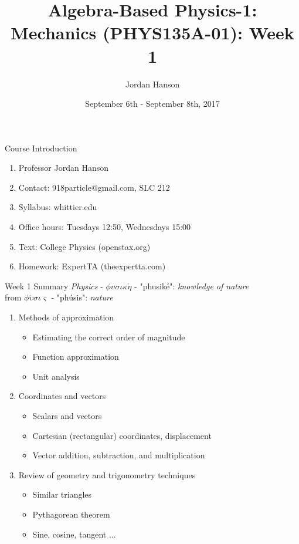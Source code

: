 \documentclass{beamer}
\title{Algebra-Based Physics-1: Mechanics (PHYS135A-01): Week 1}
\date{September 6th - September 8th, 2017}
\author{Jordan Hanson}
\institute{Whittier College Department of Physics and Astronomy}
\begin{document}
\maketitle

\begin{frame}{Course Introduction}
\begin{enumerate}
\item Professor Jordan Hanson
\item Contact: 918particle@gmail.com, SLC 212
\item Syllabus: whittier.edu
\item Office hours: Tuesdays 12:50, Wednesdays 15:00
\item Text: College Physics (openstax.org)
\item Homework: ExpertTA (theexpertta.com)
\end{enumerate}
\end{frame}

\begin{frame}{Week 1 Summary}
\textit{Physics} - $\phi\upsilon\sigma\iota\kappa\acute{\eta}$ - "phusik\'e": \textit{knowledge of nature} \\
from $\phi\acute{\upsilon}\sigma\iota\varsigma$ - "ph\'usis": \textit{nature}
\begin{enumerate}
\item Methods of approximation
\begin{itemize}
\item \alert{Estimating} the correct order of magnitude
\item \alert{Function} approximation
\item \alert{Unit analysis}
\end{itemize}
\item Coordinates and vectors
\begin{itemize}
\item \alert{Scalars} and \alert{vectors}
\item \alert{Cartesian} (rectangular) coordinates, displacement
\item \alert{Vector} addition, subtraction, and multiplication
\end{itemize}
\item Review of geometry and trigonometry techniques
\begin{itemize}
\item Similar triangles
\item Pythagorean theorem
\item Sine, cosine, tangent ...
\end{itemize}
\end{enumerate}
\end{frame}
\end{document}
